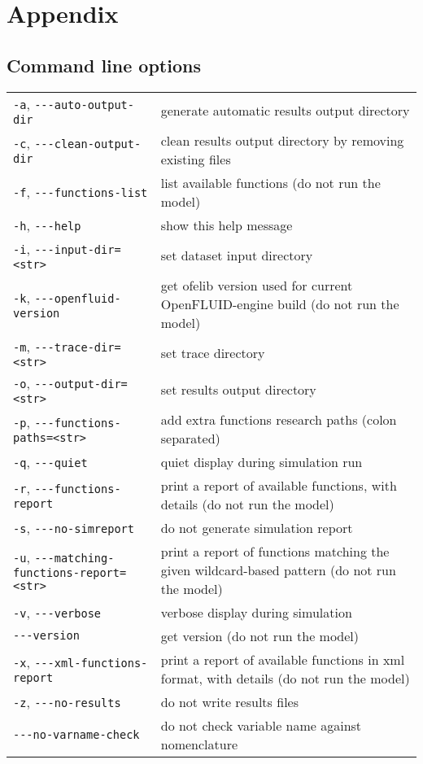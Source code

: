 \chapter{Appendix}



\section{Command line options}

\begin{center}
\begin{tabularx}{\linewidth}{lX}
\texttt{-a}, \verb?---?\texttt{auto-output-dir}&generate automatic results output directory\\
\texttt{-c}, \verb?---?\texttt{clean-output-dir}&clean results output directory by removing existing files\\
\texttt{-f}, \verb?---?\texttt{functions-list}&list available functions (do not run the model)\\
\texttt{-h}, \verb?---?\texttt{help}&show this help message\\
\texttt{-i}, \verb?---?\texttt{input-dir=<str>}&set dataset input directory\\
\texttt{-k}, \verb?---?\texttt{openfluid-version}&get ofelib version used for current OpenFLUID-engine build (do not run the model)\\
\texttt{-m}, \verb?---?\texttt{trace-dir=<str>}&set trace directory\\
\texttt{-o}, \verb?---?\texttt{output-dir=<str>}&set results output directory\\
\texttt{-p}, \verb?---?\texttt{functions-paths=<str>}&add extra functions research paths (colon separated)\\
\texttt{-q}, \verb?---?\texttt{quiet}&quiet display during simulation run\\
\texttt{-r}, \verb?---?\texttt{functions-report}&print a report of available functions, with details (do not run the model)\\
\texttt{-s}, \verb?---?\texttt{no-simreport}&do not generate simulation report\\
\texttt{-u}, \verb?---?\texttt{matching-functions-report=<str>}&print a report of functions matching the given wildcard-based pattern (do not run the model)\\
\texttt{-v}, \verb?---?\texttt{verbose}&verbose display during simulation\\
\verb?---?\texttt{version}&get version (do not run the model)\\
\texttt{-x}, \verb?---?\texttt{xml-functions-report}&print a report of available functions in xml format, with details (do not run the model)\\
\texttt{-z}, \verb?---?\texttt{no-results}&do not write results files\\
\verb?---?\texttt{no-varname-check}&do not check variable name against nomenclature\\
\end{tabularx}
\end{center}


